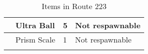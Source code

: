 \begin{longtable}{|| l l l l ||}%
\hline%
&Ultra Ball&5&Not respawnable\\%
\hline%
&Prism Scale&1&Not respawnable\\%
\hline%
\endhead%
\hline%
\caption{Items in Route 223}%
\label{tab:Route223Items}%
\end{longtable}
